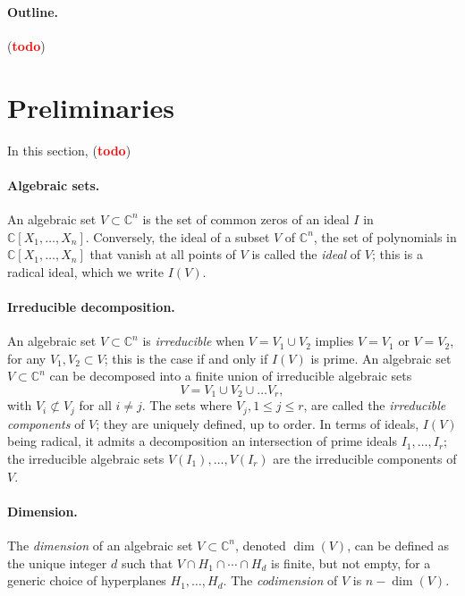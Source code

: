 \documentclass[12pt]{article}
\def\Xb{\textit{\textbf{X}}}
\def\C{\mathbb{C}}
\def\td{(\textcolor{red}{{\bf todo}})}
\begin{document}
\paragraph*{Outline.} \td


\section{Preliminaries}



In this section, \td

\paragraph*{Algebraic sets.} An algebraic set $V \subset \C^n$ is the set of common 
zeros of an ideal $I$ in $\C[X_1,\hdots,X_n].$ Conversely, the ideal
of a subset $V$ of $\C^n$, the set of polynomials in
$\C[X_1,\dots,X_n]$ that vanish at all points of $V$ is called the
\textit{ideal} of $V$; this is a radical ideal, which we write $I(V)$.

\paragraph*{Irreducible decomposition.}
An algebraic set $V \subset \C^n$ is \textit{irreducible} when $V =
V_1 \cup V_2$ implies $V=V_1$ or $V=V_2$, for any $V_1,V_2 \subset V$;
this is the case if and only if $I(V)$ is prime.  An algebraic set $V
\subset \C^n$ can be decomposed into a finite union of irreducible
algebraic sets
\[
V = V_1 \cup V_2 \cup \hdots V_r,
\]
with $V_i \not \subset V_j$ for all $i \ne j$. The sets where $V_j,
1\leq j \leq r$, are called the {\em irreducible components} of $V$;
they are uniquely defined, up to order. In terms of ideals, $I(V)$
being radical, it admits a decomposition an intersection of prime ideals
$I_1,\dots,I_r$; the irreducible algebraic sets $V(I_1),\dots,V(I_r)$ are the 
irreducible components of $V$.

\paragraph*{Dimension.}
The \textit{dimension} of an algebraic set $V \subset \C^n$, denoted
$\dim(V)$, can be defined as the unique integer $d$ such that $V \cap
H_1 \cap \cdots \cap H_d$ is finite, but not empty, for a generic
choice of hyperplanes $H_1,\dots,H_d$. The \textit{codimension} of $V$
is $n - \dim (V)$. 
\end{document}
